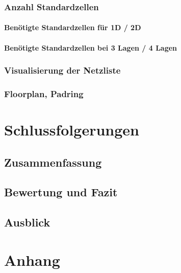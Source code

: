  \subsection{Anzahl Standardzellen}
 \subsubsection{Benötigte Standardzellen für 1D / 2D}
 \subsubsection{Benötigte Standardzellen bei 3 Lagen / 4 Lagen}
 \subsection{Visualisierung der Netzliste}
 \subsection{Floorplan, Padring}
 
 \chapter{Schlussfolgerungen}
 \section{Zusammenfassung}
 \section{Bewertung und Fazit}
 \section{Ausblick}
 
 
 \printglossary[title={Abkürzungsverzeichnis}] 
 
 \listoffigures

 \listoftables

 
 \printbibliography
 
 \chapter{Anhang}
 


